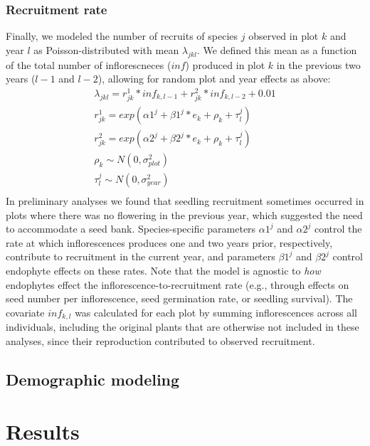 \documentclass[11pt]{article}
\begin{document}
\subsubsection*{Recruitment rate}
Finally, we modeled the number of recruits of species $j$ observed in plot $k$ and year $l$ as Poisson-distributed with mean $\lambda_{jkl}$. 
We defined this mean as a function of the total number of inflorescneces ($inf$) produced in plot $k$ in the previous two years ($l-1$ and $l-2$), allowing for random plot and year effects as above:
\begin{align*}
	\lambda_{jkl} = r^{1}_{jk} * inf_{k,l-1} + r^{2}_{jk} * inf_{k,l-2} + 0.01\\
	r^{1}_{jk} = exp(\alpha1^{j} + \beta1^{j}*e_k + \rho_k + \tau^{j}_{l})\\
	r^{2}_{jk} = exp(\alpha2^{j} + \beta2^{j}*e_k + \rho_k + \tau^{j}_{l})\\	\rho_k \sim N(0,\sigma^2_{plot})\\
	\tau^{j}_{l} \sim N(0,\sigma^2_{year})\\
\end{align*}
In preliminary analyses we found that seedling recruitment sometimes occurred in plots where there was no flowering in the previous year, which suggested the need to accommodate a seed bank. 
Species-specific parameters $\alpha1^{j}$ and $\alpha2^{j}$ control the rate at which inflorescences produces one and two years prior, respectively, contribute to recruitment in the current year, and parameters $\beta1^{j}$ and $\beta2^{j}$ control endophyte effects on these rates. 
Note that the model is agnostic to \emph{how} endophytes effect the inflorescence-to-recruitment rate (e.g., through effects on seed number per inflorescence, seed germination rate, or seedling survival). 
The covariate $inf_{k,l}$ was calculated for each plot by summing inflorescences across all individuals, including the original plants that are otherwise not included in these analyses, since their reproduction contributed to observed recruitment. 

\subsection*{Demographic modeling}

\section*{Results}
\end{document}
